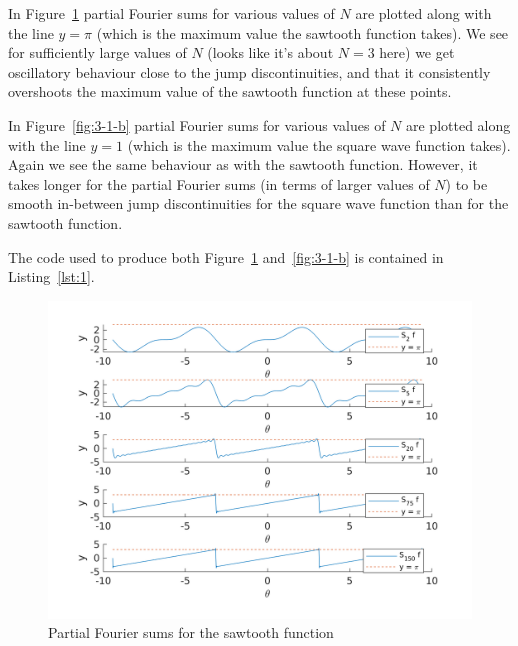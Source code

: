 \documentclass{article}
\begin{document}
In Figure~\ref{fig:3-1-a} partial Fourier sums for various values of $N$
are plotted along with the line $y = \pi$ (which is the maximum value
the sawtooth function takes). We see for sufficiently large values of
$N$ (looks like it's about $N = 3$ here) we get oscillatory behaviour
close to the jump discontinuities, and that it consistently overshoots
the maximum value of the sawtooth function at these points.

In Figure~\ref{fig:3-1-b} partial Fourier sums for various values of $N$
are plotted along with the line $y = 1$ (which is the maximum value the
square wave function takes). Again we see the same behaviour as with the
sawtooth function. However, it takes longer for the partial Fourier sums
(in terms of larger values of $N$) to be smooth in-between jump
discontinuities for the square wave function than for the sawtooth
function.

The code used to produce both Figure~\ref{fig:3-1-a} and~\ref{fig:3-1-b} is
contained in Listing~\ref{lst:1}.


\newpage

\begin{figure}[hbtp]
    \includegraphics[width=\textwidth]{q31a}
    \centering
    \caption{Partial Fourier sums for the sawtooth function}
    \label{fig:3-1-a}
\end{figure}

\newpage
\end{document}
